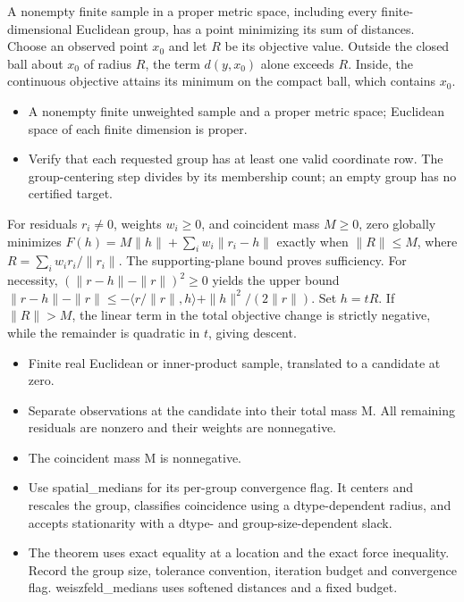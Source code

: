 \expandafter\def\csname statadic@statement@STATADIC-MEDIAN-002\endcsname{A nonempty finite sample in a proper metric space, including every
  finite-dimensional Euclidean group, has a point minimizing its sum of distances.}
\expandafter\def\csname statadic@proof@STATADIC-MEDIAN-002\endcsname{Choose an observed point $x_0$ and let $R$ be its objective value.
  Outside the closed ball about $x_0$ of radius $R$, the term $d(y,x_0)$ alone exceeds
  $R$. Inside, the continuous objective attains its minimum on the compact ball,
  which contains $x_0$.}
\expandafter\def\csname statadic@assumptions@STATADIC-MEDIAN-002\endcsname{\begin{itemize}
\item A nonempty finite unweighted sample and a proper metric space; Euclidean space of each finite dimension is proper.
\end{itemize}}
\expandafter\def\csname statadic@diagnostics@STATADIC-MEDIAN-002\endcsname{\begin{itemize}
\item Verify that each requested group has at least one valid coordinate row. The group-centering step divides by its membership count; an empty group has no certified target.
\end{itemize}}
\expandafter\def\csname statadic@statement@STATADIC-MEDIAN-003\endcsname{For residuals $r_i\ne0$, weights $w_i\ge0$, and coincident mass
  $M\ge0$, zero globally minimizes $F(h)=M\|h\|+\sum_i w_i\|r_i-h\|$
  exactly when $\|R\|\le M$, where $R=\sum_i w_i r_i/\|r_i\|$.}
\expandafter\def\csname statadic@proof@STATADIC-MEDIAN-003\endcsname{The supporting-plane bound proves sufficiency. For necessity,
  $(\|r-h\|-\|r\|)^2\ge0$ yields the upper bound
  $\|r-h\|-\|r\|\le-\langle r/\|r\|,h\rangle+\|h\|^2/(2\|r\|)$.
  Set $h=tR$. If $\|R\|>M$, the linear term in the total objective change
  is strictly negative, while the remainder is quadratic in $t$, giving descent.}
\expandafter\def\csname statadic@assumptions@STATADIC-MEDIAN-003\endcsname{\begin{itemize}
\item Finite real Euclidean or inner-product sample, translated to a candidate at zero.
\item Separate observations at the candidate into their total mass M. All remaining residuals are nonzero and their weights are nonnegative.
\item The coincident mass M is nonnegative.
\end{itemize}}
\expandafter\def\csname statadic@diagnostics@STATADIC-MEDIAN-003\endcsname{\begin{itemize}
\item Use spatial\_medians for its per-group convergence flag. It centers and rescales the group, classifies coincidence using a dtype-dependent radius, and accepts stationarity with a dtype- and group-size-dependent slack.
\item The theorem uses exact equality at a location and the exact force inequality. Record the group size, tolerance convention, iteration budget and convergence flag. weiszfeld\_medians uses softened distances and a fixed budget.
\end{itemize}}

